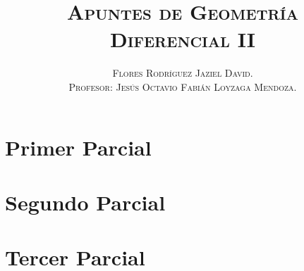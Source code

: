 \documentclass[b5paper]{book}
\title{\textsc{Apuntes de Geometría Diferencial II\vspace{3mm}
\vspace{1cm}}}
\author{\textsc{Flores Rodríguez Jaziel David.} \\
\textsc{Profesor: Jesús Octavio Fabián Loyzaga Mendoza.} \vspace{1cm}}
\theoremstyle{definition}
\theoremstyle{plain}
\begin{document}
\maketitle
\onehalfspace
\chapter{Primer Parcial}

\chapter{Segundo Parcial}

\chapter{Tercer Parcial}

\end{document}
